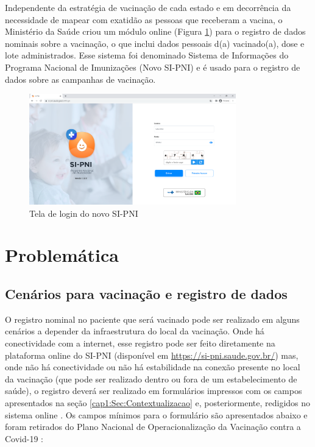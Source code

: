 Independente da estratégia de vacinação de cada estado e em decorrência da necessidade de mapear com exatidão as pessoas que receberam a vacina, o Ministério da Saúde criou um módulo online (Figura \ref{fig:sipni_login}) para o registro de dados nominais sobre a vacinação, o que inclui dados pessoais d(a) vacinado(a), dose e lote administrados. Esse sistema foi denominado Sistema de Informações do Programa Nacional de Imunizações (Novo SI-PNI) e é usado para o registro de dados sobre as campanhas de vacinação.

\begin{figure}[!ht]
  \centering
  \includegraphics[width=0.8\textwidth]{figuras/cap1/1_1_pagina_login_sipni.png}
  \caption{Tela de login do novo SI-PNI}
  \label{fig:sipni_login}
\end{figure}

\section{Problemática}
\label{cap1:Sec:Problematica}
\subsection{Cenários para vacinação e registro de dados}
\label{cap1:SubSec:CenariosVacinacao}
O registro nominal no paciente que será vacinado pode ser realizado em alguns cenários a depender da infraestrutura do local da vacinação. Onde há conectividade com a internet, esse registro pode ser feito diretamente na plataforma online do SI-PNI (disponível em \url{https://si-pni.saude.gov.br/}) mas, onde não há conectividade ou não há estabilidade na conexão presente no local da vacinação (que pode ser realizado dentro ou fora de um estabelecimento de saúde), o registro deverá ser realizado em formulários impressos com os campos apresentados na seção \ref{cap1:Sec:Contextualizacao} e, posteriormente, redigidos no sistema online \cite{ministerio2022plano}. Os campos mínimos para o formulário são apresentados abaixo e foram retirados do Plano Nacional de Operacionalização da Vacinação contra a Covid-19 \cite{ministerio2022plano}:

